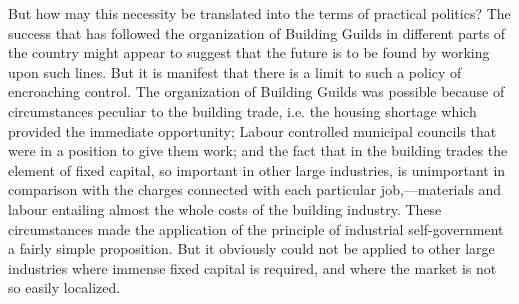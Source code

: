 \documentclass{book}
\begin{document}
But how may this necessity be translated into the terms of practical politics? The success that has followed the organization of Building Guilds in different parts of the country might appear to suggest that the future is to be found by working upon such lines. But it is manifest that there is a limit to such a policy of encroaching control. The organization of Building Guilds was possible because of circumstances peculiar to the building trade, i.e. the housing shortage which provided the immediate opportunity; Labour controlled municipal councils that were in a position to give them work; and the fact that in the building trades the element of fixed capital, so important in other large industries, is unimportant in comparison with the charges connected with each particular job,—materials and labour entailing almost the whole costs of the building industry. These circumstances made the application of the principle of industrial self-government a fairly simple proposition. But it obviously could not be applied to other large industries where immense fixed capital is required, and where the market is not so easily localized.
\end{document}

